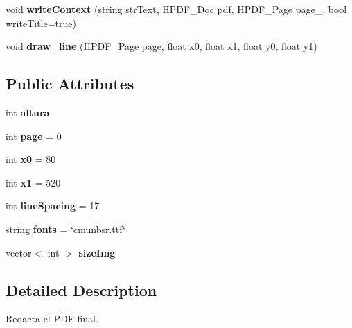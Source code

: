 \begin{DoxyCompactItemize}
\item 
\mbox{\label{classRedaction_a730c74cfc42da0e0c26dde04f827327b}} 
void {\bfseries write\+Context} (string str\+Text, H\+P\+D\+F\+\_\+\+Doc pdf, H\+P\+D\+F\+\_\+\+Page page\+\_, bool write\+Title=true)
\item 
\mbox{\label{classRedaction_abc1ee2bcbecc9009f0f2c098ffbaa450}} 
void {\bfseries draw\+\_\+line} (H\+P\+D\+F\+\_\+\+Page page, float x0, float x1, float y0, float y1)
\end{DoxyCompactItemize}
\subsection*{Public Attributes}
\begin{DoxyCompactItemize}
\item 
\mbox{\label{classRedaction_ad90a9d83dd25949cb02d7175127c0a61}} 
int {\bfseries altura}
\item 
\mbox{\label{classRedaction_a4a8fdc2588fe7d86ee2565e051324fc4}} 
int {\bfseries page} = 0
\item 
\mbox{\label{classRedaction_a9ba976b11231ce5e328aed590d5fc357}} 
int {\bfseries x0} = 80
\item 
\mbox{\label{classRedaction_a482cdb457625ad5bd40d7b06e9a71c9e}} 
int {\bfseries x1} = 520
\item 
\mbox{\label{classRedaction_a275712d1283400ede4bb27dde4dbe626}} 
int {\bfseries line\+Spacing} = 17
\item 
\mbox{\label{classRedaction_ab5f00fe8ea50f45404989dc4df7e830a}} 
string {\bfseries fonts} = \char`\"{}cmunbsr.\+ttf\char`\"{}
\item 
\mbox{\label{classRedaction_a4e1d2e3d453c0af5db42a3dd8b649745}} 
vector$<$ int $>$ {\bfseries size\+Img}
\end{DoxyCompactItemize}


\subsection{Detailed Description}
Redacta el P\+DF final. 


